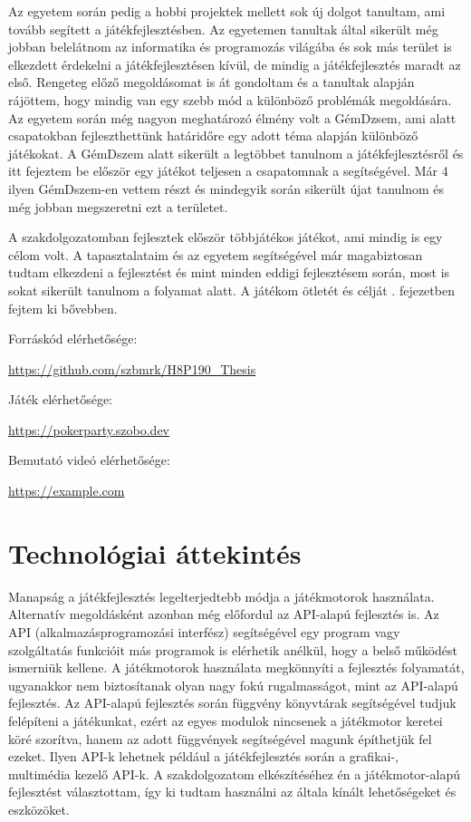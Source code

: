 \documentclass[]{thesis-ekf}
\theoremstyle{definition}
\theoremstyle{remark}
\begin{document}
Az egyetem során pedig a hobbi projektek mellett sok új dolgot tanultam, ami tovább segített a játékfejlesztésben. Az egyetemen tanultak által sikerült még jobban belelátnom az informatika és programozás világába és sok más terület is elkezdett érdekelni a játékfejlesztésen kívül, de mindig a játékfejlesztés maradt az első. Rengeteg előző megoldásomat is át gondoltam és a tanultak alapján rájöttem, hogy mindig van egy szebb mód a különböző problémák megoldására. Az egyetem során még nagyon meghatározó élmény volt a GémDzsem, ami alatt csapatokban fejleszthettünk határidőre egy adott téma alapján különböző játékokat. A GémDszem alatt sikerült a legtöbbet tanulnom a játékfejlesztésről és itt fejeztem be először egy játékot teljesen a csapatomnak a segítségével. Már 4 ilyen GémDszem-en vettem részt és mindegyik során sikerült újat tanulnom és még jobban megszeretni ezt a területet.

A szakdolgozatomban fejlesztek először többjátékos játékot, ami mindig is egy célom volt. A tapasztalataim és az egyetem segítségével már magabiztosan tudtam elkezdeni a fejlesztést és mint minden eddigi fejlesztésem során, most is sokat sikerült tanulnom a folyamat alatt. A játékom ötletét és célját . fejezetben fejtem ki bővebben.

\begin{center}
	Forráskód elérhetősége:
	
	{\color{teal}\url{https://github.com/szbmrk/H8P190_Thesis}}
	
	Játék elérhetősége:
	
	{\color{teal}\url{https://pokerparty.szobo.dev}}
	
	Bemutató videó elérhetősége:
	
	{\color{teal}\url{https://example.com}}
\end{center}
	
\chapter{Technológiai áttekintés}

Manapság a játékfejlesztés legelterjedtebb módja a játékmotorok használata. Alternatív megoldásként azonban még előfordul az API-alapú fejlesztés is. Az API (alkalmazásprogramozási interfész) segítségével egy program vagy szolgáltatás funkcióit más programok is elérhetik anélkül, hogy a belső működést ismerniük kellene. A játékmotorok használata megkönnyíti a fejlesztés folyamatát, ugyanakkor nem biztosítanak olyan nagy fokú rugalmasságot, mint az API-alapú fejlesztés. Az API-alapú fejlesztés során függvény könyvtárak segítségével tudjuk felépíteni a játékunkat, ezért az egyes modulok nincsenek a játékmotor keretei köré szorítva, hanem az adott függvények segítségével magunk építhetjük fel ezeket. Ilyen API-k lehetnek például a játékfejlesztés során a grafikai-, multimédia kezelő API-k. A szakdolgozatom elkészítéséhez én a játékmotor-alapú fejlesztést választottam, így ki tudtam használni az általa kínált lehetőségeket és eszközöket.
\end{document}
